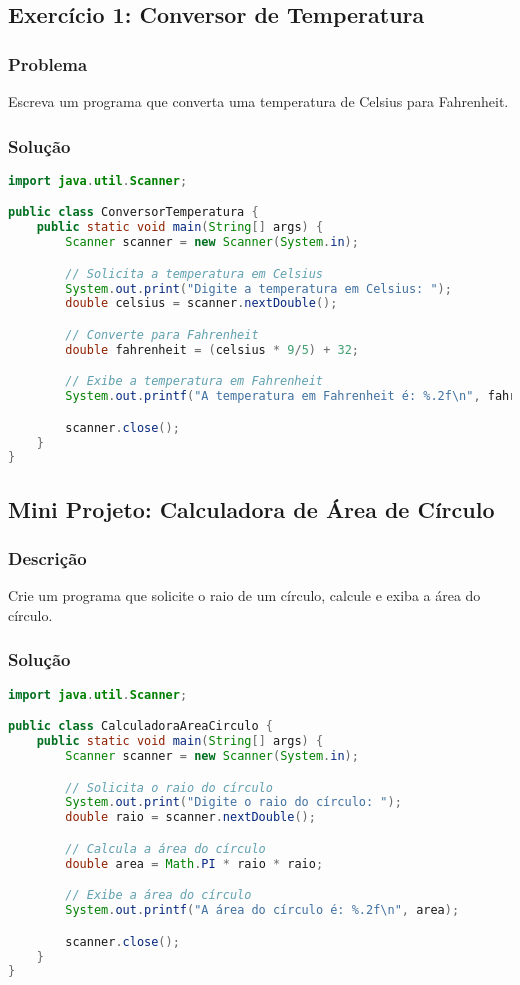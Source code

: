 \documentclass[a4paper,12pt]{book}
\begin{document}
\subsection{Exercício 1: Conversor de Temperatura}
\subsubsection{Problema}
Escreva um programa que converta uma temperatura de Celsius para Fahrenheit.

\subsubsection{Solução}
\begin{lstlisting}[language=Java, caption=Conversor de Temperatura]
import java.util.Scanner;

public class ConversorTemperatura {
    public static void main(String[] args) {
        Scanner scanner = new Scanner(System.in);

        // Solicita a temperatura em Celsius
        System.out.print("Digite a temperatura em Celsius: ");
        double celsius = scanner.nextDouble();

        // Converte para Fahrenheit
        double fahrenheit = (celsius * 9/5) + 32;

        // Exibe a temperatura em Fahrenheit
        System.out.printf("A temperatura em Fahrenheit é: %.2f\n", fahrenheit);

        scanner.close();
    }
}
\end{lstlisting}

\subsection{Mini Projeto: Calculadora de Área de Círculo}
\subsubsection{Descrição}
Crie um programa que solicite o raio de um círculo, calcule e exiba a área do círculo.

\subsubsection{Solução}
\begin{lstlisting}[language=Java, caption=Calculadora de Área de Círculo]
import java.util.Scanner;

public class CalculadoraAreaCirculo {
    public static void main(String[] args) {
        Scanner scanner = new Scanner(System.in);

        // Solicita o raio do círculo
        System.out.print("Digite o raio do círculo: ");
        double raio = scanner.nextDouble();

        // Calcula a área do círculo
        double area = Math.PI * raio * raio;

        // Exibe a área do círculo
        System.out.printf("A área do círculo é: %.2f\n", area);

        scanner.close();
    }
}
\end{lstlisting}
\end{document}
